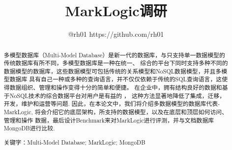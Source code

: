 \documentclass[11pt]{article}
\begin{document}
\title{MarkLogic调研}

\author{@rh01 https://github.com/rh01}

\date{}

\maketitle

\begin{abstract}

  多模型数据库（Multi-Model Database）是新一代的数据库，与只支持单一数据模型的传统数据库有所不同，多模型数据库是一种在统一、
  综合的平台下同时支持多种不同的数据模型的数据库，这些数据模型可包括传统的关系模型和NoSQL数据模型，并且多模型数据库
  具有自己一种或多种的查询语言，并不仅仅依赖于传统的SQL查询语言，这使得数据组织、管理和操作变得十分的简单和便捷。
  在企业中，拥有结构良好的数据和基于NoSQL技术的综合数据平台对用户是有益的 \cite{lu2017multi} ，
  这种方法显著地降低了集成，迁移，开发，维护和运营等问题.
  因此，在本论文中，我们将介绍多数据模型的数据库代表-MarkLogic, 将会介绍它的底层架构，所支持的数据模型，以及在底层和顶层如何访问、管理和操作
  数据，最后设计Benchmark来对MarkLogic进行评测，并与文档数据库MongoDB进行比较.

  \noindent 关键字：Multi-Model Database; MarkLogic; MongoDB

\end{abstract}



%














\end{document}
